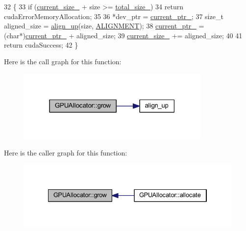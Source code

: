 \begin{DoxyCode}
32 \{
33     \textcolor{keywordflow}{if} (\mbox{\hyperlink{class_g_p_u_allocator_a8d404f40928c431ced08c013189c8c58}{current\_size\_}} + size >= \mbox{\hyperlink{class_g_p_u_allocator_a629bd3cca49d00f82cd6538e0d07d4ae}{total\_size\_}})
34     \textcolor{keywordflow}{return} cudaErrorMemoryAllocation;
35 
36     *dev\_ptr = \mbox{\hyperlink{class_g_p_u_allocator_a34ef0b84f1e5a510c4c968889b2dbf04}{current\_ptr\_}};
37     \textcolor{keywordtype}{size\_t} aligned\_size = \mbox{\hyperlink{gpu__allocator_8cpp_a9b5b2c4640739b3faa5bdeae80af1e42}{align\_up}}(size, \mbox{\hyperlink{gpu__allocator_8cpp_a450f9d8af07bfe2f313dbe3a78738a5e}{ALIGNMENT}});
38     \mbox{\hyperlink{class_g_p_u_allocator_a34ef0b84f1e5a510c4c968889b2dbf04}{current\_ptr\_}} = (\textcolor{keywordtype}{char}*)\mbox{\hyperlink{class_g_p_u_allocator_a34ef0b84f1e5a510c4c968889b2dbf04}{current\_ptr\_}} + aligned\_size;
39     \mbox{\hyperlink{class_g_p_u_allocator_a8d404f40928c431ced08c013189c8c58}{current\_size\_}} += aligned\_size;
40 
41     \textcolor{keywordflow}{return} cudaSuccess;
42 \}
\end{DoxyCode}
Here is the call graph for this function\+:\nopagebreak
\begin{figure}[H]
\begin{center}
\leavevmode
\includegraphics[width=271pt]{class_g_p_u_allocator_a04e2127f194094b27fe2351551c7ddeb_cgraph}
\end{center}
\end{figure}
Here is the caller graph for this function\+:\nopagebreak
\begin{figure}[H]
\begin{center}
\leavevmode
\includegraphics[width=334pt]{class_g_p_u_allocator_a04e2127f194094b27fe2351551c7ddeb_icgraph}
\end{center}
\end{figure}
\mbox{\label{class_g_p_u_allocator_a4734a73038db3517f88a64e6b5f556ef}} 
